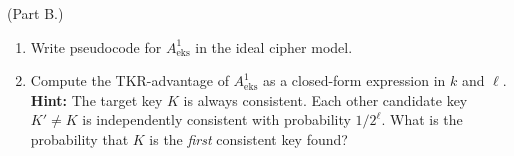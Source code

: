 \documentclass[11pt]{article}
\begin{document}
\medskip\noindent (Part B.)

\begin{enumerate}
\item[(i)] Write pseudocode for $A^1_{\mathrm{eks}}$ in the ideal cipher model. %

\item[(ii)] Compute the TKR-advantage of $A^1_{\mathrm{eks}}$ as a closed-form expression in $k$ and $\ell$. \textbf{Hint:} The target key $K$ is always consistent. Each other candidate key $K' \neq K$ is independently consistent with probability $1/2^\ell$. What is the probability that $K$ is the \emph{first} consistent key found?
\end{enumerate}
\end{document}
